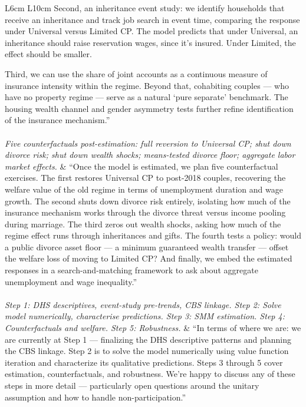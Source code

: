 \documentclass[11pt, a4paper]{article}
\begin{document}
\begin{longtable}{L{6cm} L{10cm}}
Second, an inheritance event study: we identify households that receive an inheritance and track job search in event time, comparing the response under Universal versus Limited CP. The model predicts that under Universal, an inheritance should raise reservation wages, since it's insured. Under Limited, the effect should be smaller.

Third, we can use the share of joint accounts as a continuous measure of insurance intensity within the regime. Beyond that, cohabiting couples — who have no property regime — serve as a natural `pure separate' benchmark. The housing wealth channel and gender asymmetry tests further refine identification of the insurance mechanism.'' \\[1em]

\\
\textit{Five counterfactuals post-estimation: full reversion to Universal CP; shut down divorce risk; shut down wealth shocks; means-tested divorce floor; aggregate labor market effects.} &
``Once the model is estimated, we plan five counterfactual exercises. The first restores Universal CP to post-2018 couples, recovering the welfare value of the old regime in terms of unemployment duration and wage growth. The second shuts down divorce risk entirely, isolating how much of the insurance mechanism works through the divorce threat versus income pooling during marriage. The third zeros out wealth shocks, asking how much of the regime effect runs through inheritances and gifts. The fourth tests a policy: would a public divorce asset floor — a minimum guaranteed wealth transfer — offset the welfare loss of moving to Limited CP? And finally, we embed the estimated responses in a search-and-matching framework to ask about aggregate unemployment and wage inequality.'' \\[1em]

\\
\textit{Step 1: DHS descriptives, event-study pre-trends, CBS linkage.
Step 2: Solve model numerically, characterise predictions.
Step 3: SMM estimation.
Step 4: Counterfactuals and welfare.
Step 5: Robustness.} &
``In terms of where we are: we are currently at Step 1 — finalizing the DHS descriptive patterns and planning the CBS linkage. Step 2 is to solve the model numerically using value function iteration and characterize its qualitative predictions. Steps 3 through 5 cover estimation, counterfactuals, and robustness. We're happy to discuss any of these steps in more detail — particularly open questions around the unitary assumption and how to handle non-participation.'' \\[1em]


\end{longtable}
\end{document}
